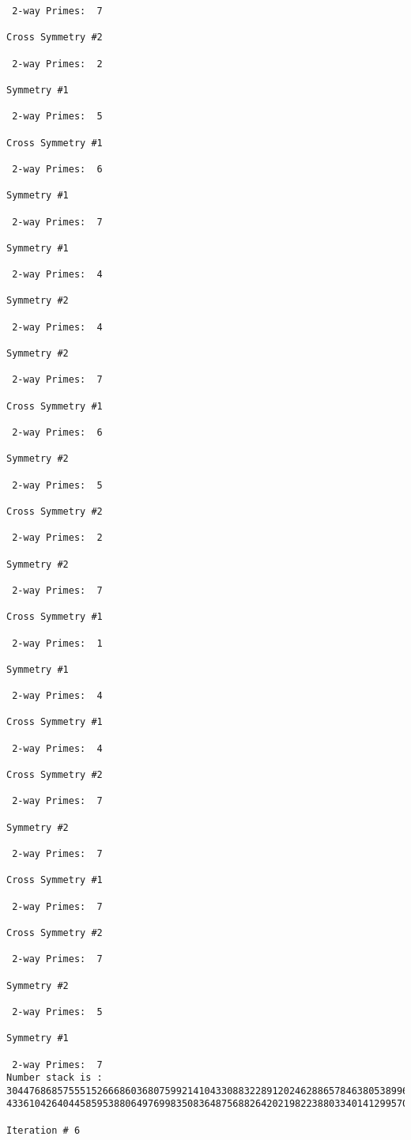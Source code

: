 \begin{verbatim}
 2-way Primes: 	7

Cross Symmetry #2

 2-way Primes: 	2

Symmetry #1

 2-way Primes: 	5

Cross Symmetry #1

 2-way Primes: 	6

Symmetry #1

 2-way Primes: 	7

Symmetry #1

 2-way Primes: 	4

Symmetry #2

 2-way Primes: 	4

Symmetry #2

 2-way Primes: 	7

Cross Symmetry #1

 2-way Primes: 	6

Symmetry #2

 2-way Primes: 	5

Cross Symmetry #2

 2-way Primes: 	2

Symmetry #2

 2-way Primes: 	7

Cross Symmetry #1

 2-way Primes: 	1

Symmetry #1

 2-way Primes: 	4

Cross Symmetry #1

 2-way Primes: 	4

Cross Symmetry #2

 2-way Primes: 	7

Symmetry #2

 2-way Primes: 	7

Cross Symmetry #1

 2-way Primes: 	7

Cross Symmetry #2

 2-way Primes: 	7

Symmetry #2

 2-way Primes: 	5

Symmetry #1

 2-way Primes: 	7
Number stack is :
30447686857555152666860368075992141043308832289120246288657846380538996794608835958544046240163340857
43361042640445859538806497699835083648756882642021982238803340141299570863068666251555758686744037580

Iteration #	6


\end{verbatim}

